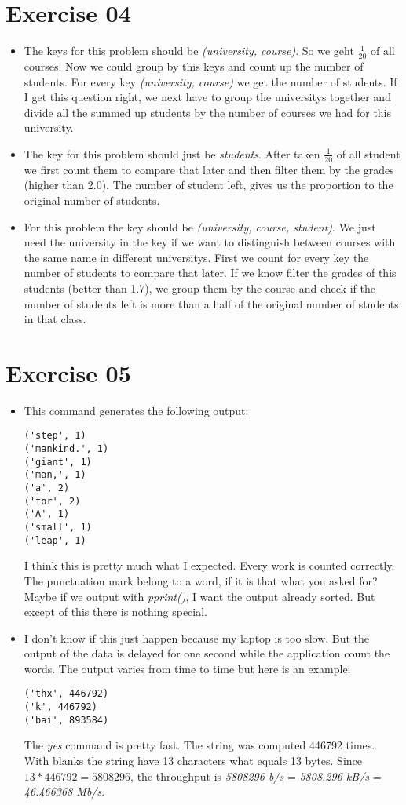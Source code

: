 \documentclass[11pt,a4paper]{scrartcl}
\begin{document}
\section*{Exercise 04}
	
\begin{itemize}
\item[a)] The keys for this problem should be \textit{(university, course)}. So we geht $\frac{1}{20}$ of all courses. Now we could group by this keys and count up the number of students. For every key \textit{(university, course)} we get the number of students. If I get this question right, we next have to group the universitys together and divide all the summed up students by the number of courses we had for this university.
\item[b)] The key for this problem should just be \textit{students}. After taken $\frac{1}{20}$ of all student we first count them to compare that later and then filter them by the grades (higher than 2.0). The number of student left, gives us the proportion to the original number of students.
\item[c)] For this problem the key should be \textit{(university, course, student)}. We just need the university in the key if we want to distinguish between courses with the same name in different universitys. First we count for every key the number of students to compare that later. If we know filter the grades of this students (better than 1.7), we group them by the course and check if the number of students left is more than a half of the original number of students in that class.
\end{itemize}

\section*{Exercise 05}

\begin{itemize}
\item[a)] This command generates the following output:
\begin{lstlisting}
('step', 1)
('mankind.', 1)
('giant', 1)
('man,', 1)
('a', 2)
('for', 2)
('A', 1)
('small', 1)
('leap', 1)
\end{lstlisting}
I think this is pretty much what I expected. Every work is counted correctly. The punctuation mark belong to a word, if it is that what you asked for? Maybe if we output with \textit{pprint()}, I want the output already sorted. But except of this there is nothing special.
\item[b)] I don't know if this just happen because my laptop is too slow. But the output of the data is delayed for one second while the application count the words. The output varies from time to time but here is an example:
\begin{lstlisting}
('thx', 446792)
('k', 446792)
('bai', 893584)
\end{lstlisting}
The \textit{yes} command is pretty fast. The string was computed 446792 times. With blanks the string have 13 characters what equals 13 bytes. Since $13 * 446792 = 5808296$, the throughput is \textit{5808296 b/s} = \textit{5808.296 kB/s} = \textit{46.466368 Mb/s}.
\end{itemize}
\end{document}
